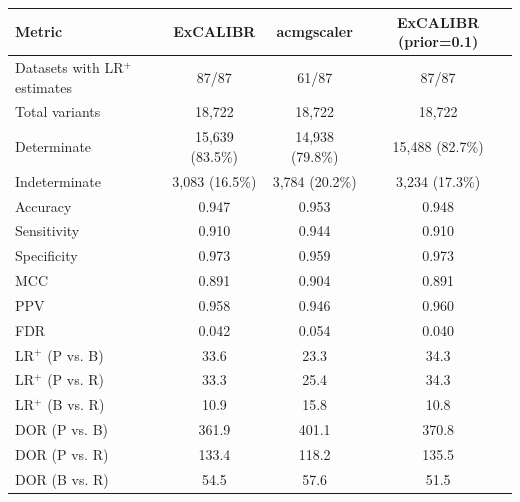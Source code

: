 \begin{tabular}{lccc}
\toprule
Metric & ExCALIBR & acmgscaler & ExCALIBR (prior=0.1) \\
\midrule
Datasets with LR$^+$ estimates & 87/87 & 61/87 & 87/87 \\
Total variants & 18,722 & 18,722 & 18,722 \\
Determinate & 15,639 (83.5\%) & 14,938 (79.8\%) & 15,488 (82.7\%) \\
Indeterminate & 3,083 (16.5\%) & 3,784 (20.2\%) & 3,234 (17.3\%) \\
\midrule
Accuracy & 0.947 & 0.953 & 0.948 \\
Sensitivity & 0.910 & 0.944 & 0.910 \\
Specificity & 0.973 & 0.959 & 0.973 \\
MCC & 0.891 & 0.904 & 0.891 \\
PPV & 0.958 & 0.946 & 0.960 \\
FDR & 0.042 & 0.054 & 0.040 \\
\midrule
LR$^+$ (P vs. B) & 33.6 & 23.3 & 34.3 \\
LR$^+$ (P vs. R) & 33.3 & 25.4 & 34.3 \\
LR$^+$ (B vs. R) & 10.9 & 15.8 & 10.8 \\
DOR (P vs. B) & 361.9 & 401.1 & 370.8 \\
DOR (P vs. R) & 133.4 & 118.2 & 135.5 \\
DOR (B vs. R) & 54.5 & 57.6 & 51.5 \\
\bottomrule
\end{tabular}
